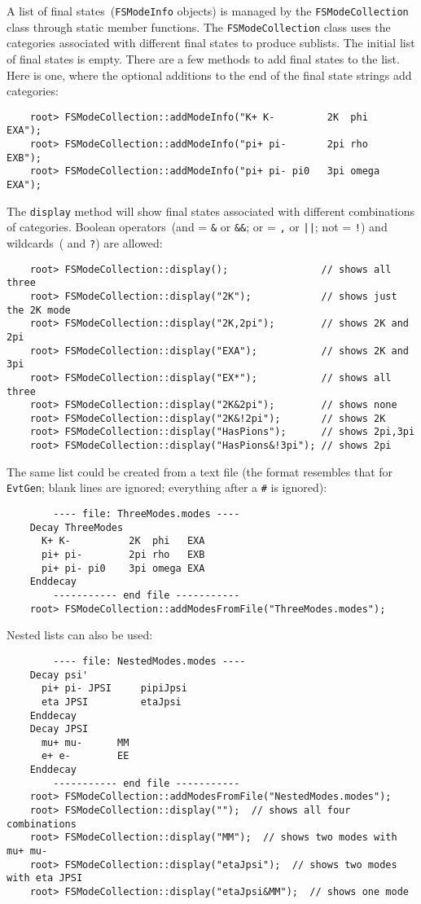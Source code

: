 \documentclass[11pt]{article}
\begin{document}
A list of final states~({\tt FSModeInfo} objects) is managed by the {\tt FSModeCollection} class through static member functions.  The {\tt FSModeCollection} class uses the categories associated with different final states to produce sublists.  The initial list of final states is empty.  There are a few methods to add final states to the list.  Here is one, where the optional additions to the end of the final state strings add categories:
\begin{verbatim}
    root> FSModeCollection::addModeInfo("K+ K-         2K  phi   EXA");
    root> FSModeCollection::addModeInfo("pi+ pi-       2pi rho   EXB");
    root> FSModeCollection::addModeInfo("pi+ pi- pi0   3pi omega EXA");
\end{verbatim}

The {\tt display} method will show final states associated with different combinations of categories.  Boolean operators~(and = {\tt\&} or {\tt\&\&}; or = {\tt,} or {\tt||}; not = {\tt!}) and wildcards~({\tt*} and {\tt?}) are allowed:
\begin{verbatim}
    root> FSModeCollection::display();                // shows all three
    root> FSModeCollection::display("2K");            // shows just the 2K mode
    root> FSModeCollection::display("2K,2pi");        // shows 2K and 2pi
    root> FSModeCollection::display("EXA");           // shows 2K and 3pi
    root> FSModeCollection::display("EX*");           // shows all three
    root> FSModeCollection::display("2K&2pi");        // shows none
    root> FSModeCollection::display("2K&!2pi");       // shows 2K
    root> FSModeCollection::display("HasPions");      // shows 2pi,3pi
    root> FSModeCollection::display("HasPions&!3pi"); // shows 2pi
\end{verbatim}

The same list could be created from a text file (the format resembles that for {\tt EvtGen}; blank lines are ignored; everything after a {\tt \#} is ignored):
\begin{verbatim}
        ---- file: ThreeModes.modes ----
    Decay ThreeModes
      K+ K-          2K  phi   EXA
      pi+ pi-        2pi rho   EXB
      pi+ pi- pi0    3pi omega EXA
    Enddecay
        ----------- end file -----------
    root> FSModeCollection::addModesFromFile("ThreeModes.modes");
\end{verbatim}
Nested lists can also be used:
\begin{verbatim}
        ---- file: NestedModes.modes ----
    Decay psi'
      pi+ pi- JPSI     pipiJpsi
      eta JPSI         etaJpsi
    Enddecay
    Decay JPSI
      mu+ mu-      MM
      e+ e-        EE
    Enddecay
        ----------- end file -----------
    root> FSModeCollection::addModesFromFile("NestedModes.modes");
    root> FSModeCollection::display("");  // shows all four combinations 
    root> FSModeCollection::display("MM");  // shows two modes with mu+ mu- 
    root> FSModeCollection::display("etaJpsi");  // shows two modes with eta JPSI 
    root> FSModeCollection::display("etaJpsi&MM");  // shows one mode 
\end{verbatim}
\end{document}
